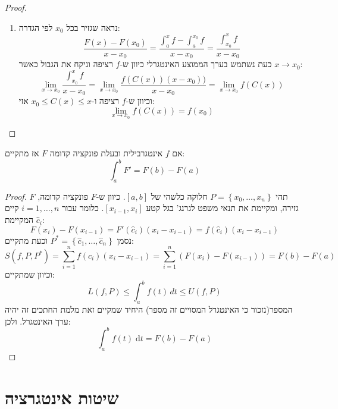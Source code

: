 \documentclass{tstextbook}
\begin{document}
\begin{proof}
  \begin{enumerate}
    \item נראה שגזיר בכל \(x_0\) לפי הגדרה:\\
$$\frac{F(x)-F(x_0)}{x-x_0}=\frac{\int_a^x f -\int_a^{x_0} f}{x-x_0}=\frac{\int_{x_0}^x f}{x-x_0}$$
כעת נשתמש בערך הממוצע האינטגרלי כיוון ש-\(f\) רציפה וניקח את הגבול כאשר \(x\rightarrow x_0\):
$$\lim_{x\rightarrow x_0} \frac{\int_{x_0}^x f}{x-x_0} = \lim_{x\rightarrow x_0} \frac{f(C(x))(x-x_0))}{x-x_0}=\lim_{x\rightarrow x_0} f(C(x))$$
וכיוון ש-\(f\) רציפה ו-\(x_0 \leq C(x)\leq x\) אזי:
$$\underset{x\rightarrow x_0}{\lim} f(C(x))=f(x_0)$$
  \end{enumerate}
\end{proof}
\begin{proposition}
אם \(f\) אינטגרבילית ובעלת פונקציה קדומה \(F\) אז מתקיים: 
$$\int_a^b F' = F(b)-F(a)$$

\end{proposition}
\begin{proof}
תהי \(P=\left\{  x_{0},\dots,x_{n}  \right\}\) חלוקה כלשהי של \([a,b]\). כיוון ש-\(F\) פונקציה קדומה, \(F\) גזירה, ומקיימת את תנאי משפט לגרנג' בגל קטע \([x_{i-1},x_{i}]\). כלומר עבור \(i=1,\dots,n\) קיים \(\hat{c}_{i}\) המקיימת:
$$F(x_{i})-F(x_{i-1})=F'\left( \hat{c}_{i} \right)(x_{i}-x_{i-1})=f\left( \hat{c}_{i} \right)(x_{i}-x_{i-1})$$
נסמן \(P^{*}=\left\{  \hat{c}_{1},\dots,\hat{c}_{n}  \right\}\) וכעת מתקיים:
$$S(f,P,P^{*})=\sum_{i=1}^{n} f\left( \hat{c}_{i} \right)(x_{i}-x_{i-1})=\sum_{i=1}^{n} (F(x_{i})-F(x_{i-1}))=F(b)-F(a)$$
וכיוון שמתקיים:
$$L(f,P)\leq \int_{a}^{b} f(t) \, dt\leq U(f,P) $$
המספר(נזכור כי האינטגרל המסויים זה מספר) היחיד שמקיים זאת מלמת החתכים זה יהיה ערך האינטגרל. ולכן:
$$\int_{a}^{b}f(t)\;\mathrm{d}t=F(b)-F(a)$$

\end{proof}
\section{שיטות אינטגרציה}
\end{document}
